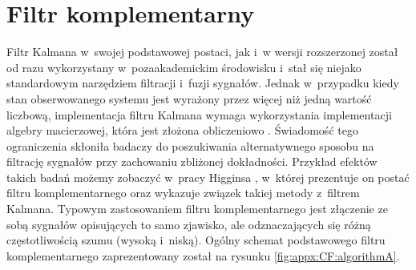 \section*{Filtr komplementarny}\label{sec:appx:filters:CF}
Filtr Kalmana w~swojej podstawowej postaci, jak i~w wersji rozszerzonej został od razu wykorzystany w~pozaakademickim środowisku i~stał się niejako standardowym narzędziem filtracji i~fuzji sygnałów. Jednak w~przypadku kiedy stan obserwowanego systemu jest wyrażony przez więcej niż jedną wartość liczbową, implementacja filtru Kalmana wymaga wykorzystania implementacji algebry macierzowej, która jest złożona obliczeniowo \cite{wiki:MatrixAlgebraComplexity2016}. Świadomość tego ograniczenia skłoniła badaczy do poszukiwania alternatywnego sposobu na filtrację sygnałów przy zachowaniu zbliżonej dokładności. Przykład efektów takich badań możemy zobaczyć w~pracy Higginsa \cite{Higgins1975}, w~której prezentuje on postać filtru komplementarnego oraz wykazuje związek takiej metody z~filtrem Kalmana. Typowym zastosowaniem filtru komplementarnego jest złączenie ze sobą sygnałów opisujących to samo zjawisko, ale odznaczających się różną częstotliwością szumu (wysoką i~niską). Ogólny schemat podstawowego filtru komplementarnego zaprezentowany został na rysunku \ref{fig:appx:CF:algorithmA}.
		
\newcommand{\suma}{\Large$+$}
\newcommand{\inte}{$\displaystyle \int$}
\newcommand{\derv}{\huge$\frac{d}{dt}$}
		
